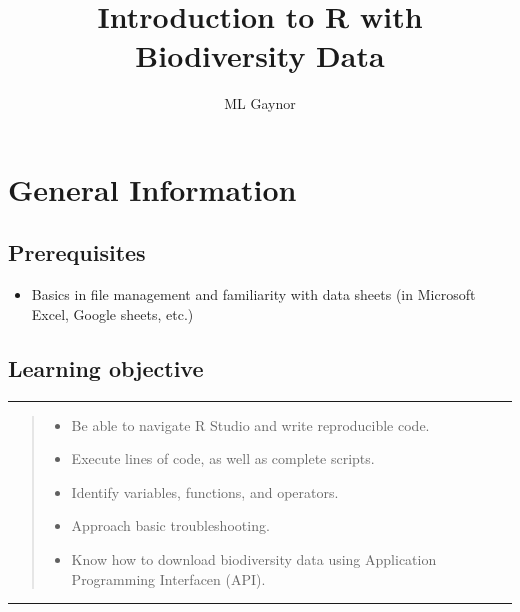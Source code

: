 \documentclass[
]{book}
\title{Introduction to R with Biodiversity Data}
\author{ML Gaynor}
\date{}
\providecommand{\tightlist}{%
  \setlength{\itemsep}{0pt}\setlength{\parskip}{0pt}}
\begin{document}
\maketitle

{
\hypersetup{linkcolor=}
\setcounter{tocdepth}{1}
\tableofcontents
}
\hypertarget{general-information}{%
\chapter{General Information}\label{general-information}}

\hypertarget{prerequisites}{%
\section{Prerequisites}\label{prerequisites}}

\begin{itemize}
\tightlist
\item
  Basics in file management and familiarity with data sheets (in Microsoft Excel, Google sheets, etc.)
\end{itemize}

\hypertarget{learning-objective}{%
\section{Learning objective}\label{learning-objective}}

\begin{center}\rule{0.5\linewidth}{0.5pt}\end{center}

\begin{quote}
\begin{itemize}
\tightlist
\item
  Be able to navigate R Studio and write reproducible code.\\
\item
  Execute lines of code, as well as complete scripts.\\
\item
  Identify variables, functions, and operators.\\
\item
  Approach basic troubleshooting.\\
\item
  Know how to download biodiversity data using Application Programming Interfacen (API).
\end{itemize}
\end{quote}

\begin{center}\rule{0.5\linewidth}{0.5pt}\end{center}
\end{document}
